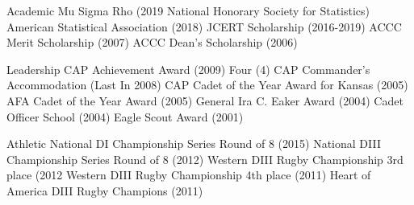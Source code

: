 
Academic
Mu Sigma Rho (2019 National Honorary Society for Statistics)
American Statistical Association (2018)
JCERT Scholarship (2016-2019)
ACCC Merit Scholarship (2007)
ACCC Dean’s Scholarship (2006)

\vspace*{0.01 in}


Leadership
CAP Achievement Award (2009)
Four (4) CAP Commander’s Accommodation (Last In 2008)
CAP Cadet of the Year Award for Kansas (2005)
AFA Cadet of the Year Award (2005)
General Ira C. Eaker Award (2004)
Cadet Officer School (2004)
Eagle Scout Award (2001)

\vspace*{0.01 in}


Athletic
National DI Championship Series Round of 8 (2015)
National DIII Championship Series Round of 8 (2012)
Western DIII Rugby Championship 3rd place (2012
Western DIII Rugby Championship 4th place (2011)
Heart of America DIII Rugby Champions (2011)
